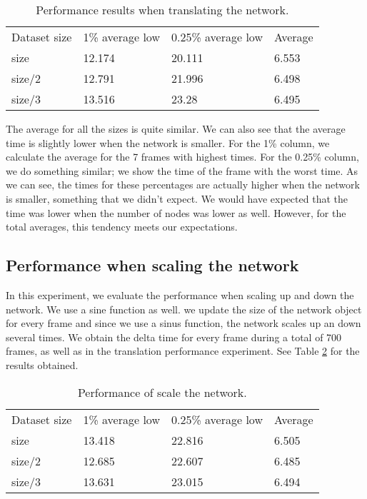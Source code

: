 \begin{table}[h!]
\centering
\begin{tabular}{llll}
Dataset size & 1\% average low & 0.25\% average low & Average \\
size & 12.174 & 20.111 & 6.553 \\
size/2 & 12.791 & 21.996 & 6.498 \\
size/3 & 13.516 & 23.28 & 6.495 \\
\end{tabular}
\caption{Performance results when translating the network.}
\label{tab:experiment_moving}
\end{table}

The average for all the sizes is quite similar. We can also see that the average time is slightly lower when the network is smaller. For the 1\% column, we calculate the average for the 7 frames with highest times. For the 0.25\% column, we do something similar; we show the time of the frame with the worst time. As we can see, the times for these percentages are actually higher when the network is smaller, something that we didn't expect. We would have expected that the time was lower when the number of nodes was lower as well. However, for the total averages, this tendency meets our expectations.

\subsection{Performance when scaling the network}
In this experiment, we evaluate the performance when scaling up and down the network. We use a sine function as well. we update the size of the network object for every frame and since we use a sinus function, the network scales up an down several times. We obtain the delta time for every frame during a total of 700 frames, as well as in the translation performance experiment. See Table \ref{tab:experiment_scale} for the results obtained.

\begin{table}[h!]
\centering
\begin{tabular}{llll}
Dataset size & 1\% average low & 0.25\% average low & Average \\
size & 13.418 & 22.816 & 6.505 \\
size/2 & 12.685 & 22.607 & 6.485 \\
size/3 & 13.631 & 23.015 & 6.494 \\
\end{tabular}
\caption{Performance of scale the network.}
\label{tab:experiment_scale}
\end{table}


